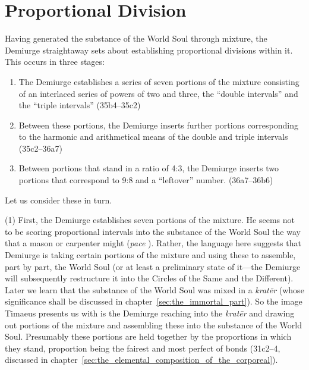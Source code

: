 
\section{Proportional Division} %
\label{sec:proportional_division}

Having generated the substance of the World Soul through mixture, the Demiurge straightaway sets about establishing proportional divisions within it. This occurs in three stages:
\begin{enumerate}[(1)]
	\item The Demiurge establishes a series of seven portions of the mixture consisting of an interlaced series of powers of two and three, the ``double intervals'' and the ``triple intervals'' (35b4--35c2)
	\item Between these portions, the Demiurge inserts further portions corresponding to the harmonic and arithmetical means of the double and triple intervals (35c2--36a7)
	\item Between portions that stand in a ratio of 4:3, the Demiurge inserts two portions that correspond to 9:8 and a ``leftover'' number. (36a7--36b6)
\end{enumerate}
Let us consider these in turn.

(1) First, the Demiurge establishes seven portions of the mixture. He seems not to be scoring proportional intervals into the substance of the World Soul the way that a mason or carpenter might (\emph{pace} \citealt{Robinson:1970lq}). Rather, the language here suggests that Demiurge is taking certain portions of the mixture and using these to assemble, part by part, the World Soul (or at least a preliminary state of it---the Demiurge will subsequently restructure it into the Circles of the Same and the Different). Later we learn that the substance of the World Soul was mixed in a \emph{kratēr} (whose significance shall be discussed in chapter~\ref{sec:the_immortal_part}). So the image Timaeus presents us with is the Demiurge reaching into the \emph{kratēr} and drawing out portions of the mixture and assembling these into the substance of the World Soul. Presumably these portions are held together by the proportions in which they stand, proportion being the fairest and most perfect of bonds (31c2–4, discussed in chapter~\ref{sec:the_elemental_composition_of_the_corporeal}).

